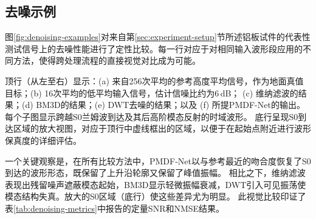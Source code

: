 \subsection{去噪示例}
\label{sec:experiment-fig4}

图\ref{fig:denoising-examples}对来自第\ref{sec:experiment-setup}节所述铝板试件的代表性测试信号上的去噪性能进行了定性比较。每一行对应于对相同输入波形段应用的不同方法，使得跨处理流程的直接视觉对比成为可能。

顶行（从左至右）显示：(a) 来自256次平均的参考高度平均信号，作为地面真值目标；(b) 16次平均的低平均输入信号，估计信噪比约为6\,dB；
(c) 维纳滤波的结果；(d) BM3D的结果；(e) DWT去噪的结果；以及 (f) 所提PMDF-Net的输出。
每个子图显示跨越S0兰姆波到达及其后高阶模态反射的时域波形。
底行呈现S0到达区域的放大视图，对应于顶行中虚线框出的区域，以便于在起始点附近进行波形保真度的详细评估。

一个关键观察是，在所有比较方法中，PMDF-Net以与参考最近的吻合度恢复了S0到达的波形形态，既保留了上升沿轮廓又保留了峰值振幅。
相比之下，维纳滤波表现出残留噪声遮蔽模态起始，BM3D显示轻微振幅衰减，DWT引入可见振荡使模态结构失真。放大的S0区域（底行）使这些差异尤为明显。
此视觉比较印证了表\ref{tab:denoising-metrics}中报告的定量SNR和NMSE结果。

